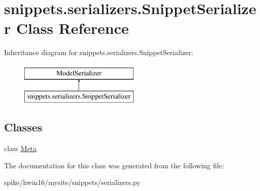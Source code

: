 \hypertarget{classsnippets_1_1serializers_1_1_snippet_serializer}{}\section{snippets.\+serializers.\+Snippet\+Serializer Class Reference}
\label{classsnippets_1_1serializers_1_1_snippet_serializer}
Inheritance diagram for snippets.\+serializers.\+Snippet\+Serializer\+:\begin{figure}[H]
\begin{center}
\leavevmode
\includegraphics[height=2.000000cm]{classsnippets_1_1serializers_1_1_snippet_serializer}
\end{center}
\end{figure}
\subsection*{Classes}
\begin{DoxyCompactItemize}
\item 
class \mbox{\hyperlink{classsnippets_1_1serializers_1_1_snippet_serializer_1_1_meta}{Meta}}
\end{DoxyCompactItemize}


The documentation for this class was generated from the following file\+:\begin{DoxyCompactItemize}
\item 
spike/hwin16/mysite/snippets/serializers.\+py\end{DoxyCompactItemize}
